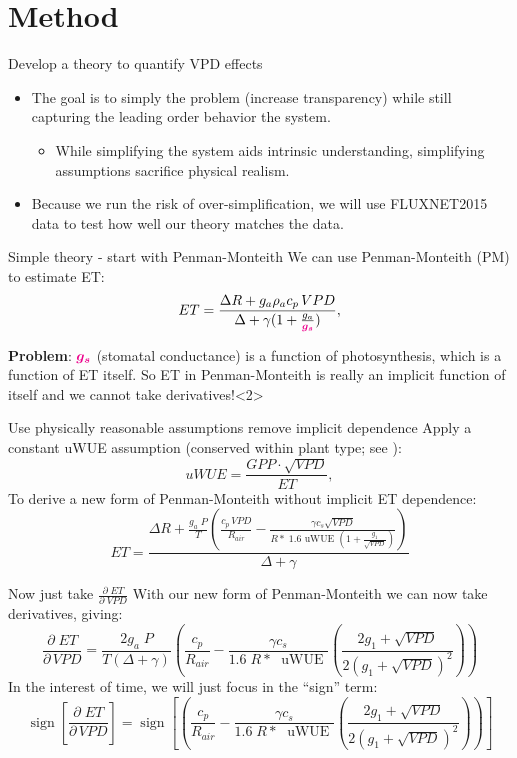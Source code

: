 \documentclass[aspectratio=169]{beamer}
\DeclareMathOperator{\sign}{sign}
\begin{document}
\section{Method}
\begin{frame}{Develop a theory to quantify VPD effects}
  \begin{itemize}
  \item The goal is to simply the problem (increase transparency) while still capturing the leading order behavior the system.
    \begin{itemize}
    \item While simplifying the system aids intrinsic understanding, simplifying assumptions sacrifice physical realism.
    \end{itemize}
  \item Because we run the risk of over-simplification, we will use FLUXNET2015 data to test how well our theory matches the data. 
  \end{itemize}
\end{frame}

\begin{frame}{Simple theory - start with Penman-Monteith}
  We can use Penman-Monteith (PM) to estimate ET:
    \[ET = \frac{\Delta R + g_a \rho_a c_p \, VPD}{\Delta + \gamma(1 + \frac{g_a}{\textcolor{magenta}{\boldsymbol{g_s}}})},\]
  \begin{overprint}
    \textbf{Problem}: \Large $\textcolor{magenta}{\boldsymbol{g_s}}$ \normalsize (stomatal conductance) is a function of photosynthesis, which is a function of ET itself.  So ET in Penman-Monteith is really an implicit function of itself and we cannot take derivatives!<2>
  \end{overprint}
\end{frame}

\begin{frame}{Use physically reasonable assumptions remove implicit dependence}
Apply a constant uWUE assumption (conserved within plant type; see \cite{Zhou_2016}):
\[uWUE = \frac{GPP \cdot \sqrt{VPD}}{ET},\]
To derive a new form of Penman-Monteith without implicit ET dependence:
  \[  ET = \frac{\Delta R + \frac{g_a\; P}{T} \left( \frac{ c_p \, VPD}{R_{air}} -  \frac{\gamma c_s \sqrt{VPD} }{ R* \; 1.6 \text{ uWUE } (1 + \frac{g_1}{\sqrt{VPD}})} \right)}{ \Delta + \gamma}\]
\end{frame}

\begin{frame}{Now just take $\frac{\partial \; ET}{\partial \; VPD}$}
  With our new form of Penman-Monteith we can now take derivatives, giving:
  \[\frac{\partial \;  ET}{\partial \, VPD} = \frac{2 g_a \; P}{T(\Delta + \gamma)}   \left(\frac{ c_p}{R_{air}} - \frac{\gamma c_s }{1.6 \; R*\; \text{ uWUE }} \left( \frac{2 g_1 + \sqrt{VPD}}{2 (g_1 + \sqrt{VPD})^2}\right) \right)\]
  In the interest of time, we will just focus in the ``sign'' term:
  \[\sign \left[\frac{\partial \;  ET}{\partial \, VPD}\right] = \sign \left[  \left(\frac{ c_p}{R_{air}} - \frac{\gamma c_s }{1.6 \; R*\; \text{ uWUE }} \left( \frac{2 g_1 + \sqrt{VPD}}{2 (g_1 + \sqrt{VPD})^2}\right) \right) \right] \]

\end{frame}
\end{document}
